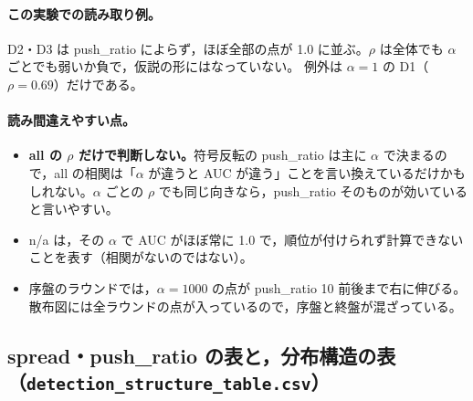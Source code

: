 \documentclass[a4j, dvipdfmx]{jsarticle}  %
\begin{document}
\paragraph{この実験での読み取り例。}
D2・D3 は push\_ratio によらず，ほぼ全部の点が 1.0 に並ぶ。$\rho$ は全体でも $\alpha$ ごとでも弱いか負で，仮説の形にはなっていない。
例外は $\alpha = 1$ の D1（$\rho = 0.69$）だけである。

\paragraph{読み間違えやすい点。}
\begin{itemize}
  \item \textbf{all の $\rho$ だけで判断しない。}符号反転の push\_ratio は主に $\alpha$ で決まるので，all の相関は「$\alpha$ が違うと AUC が違う」ことを言い換えているだけかもしれない。$\alpha$ ごとの $\rho$ でも同じ向きなら，push\_ratio そのものが効いていると言いやすい。
  \item n/a は，その $\alpha$ で AUC がほぼ常に 1.0 で，順位が付けられず計算できないことを表す（相関がないのではない）。
  \item 序盤のラウンドでは，$\alpha = 1000$ の点が push\_ratio 10 前後まで右に伸びる。散布図には全ラウンドの点が入っているので，序盤と終盤が混ざっている。
\end{itemize}

\subsection{spread・push\_ratio の表と，分布構造の表（\texttt{detection\_structure\_table.csv}）}
\end{document}

